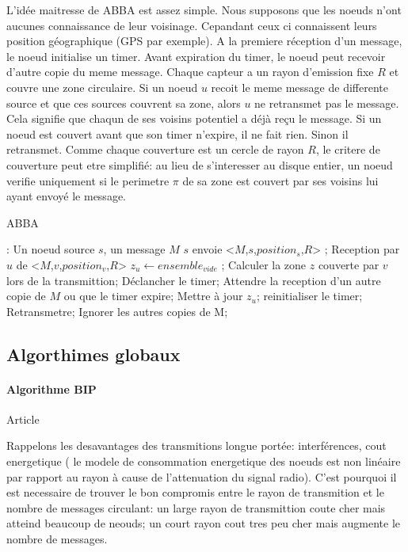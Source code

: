 L'idée maitresse de ABBA est assez simple. Nous supposons que les noeuds n'ont aucunes connaissance de leur voisinage. Cepandant ceux ci connaissent leurs position géographique (GPS par exemple).
A la premiere réception d'un message, le noeud initialise un timer. Avant expiration du timer, le noeud peut recevoir d'autre copie du meme message. Chaque capteur a un rayon d'emission fixe $R$
et couvre une zone circulaire. Si un noeud $u$ recoit le meme message de differente source et que ces sources couvrent sa zone, alors $u$ ne retransmet pas le message.
Cela signifie que chaqun de ses voisins potentiel a déjà reçu le message. Si un noeud est couvert avant que son timer n'expire, il ne fait rien. Sinon il retransmet.
Comme chaque couverture est un cercle de rayon $R$, le critere de couverture peut etre simplifié: au lieu de s'interesser au disque entier, un noeud verifie uniquement si le perimetre $\pi$ de sa zone est couvert par 
ses voisins lui ayant envoyé le message. 

\begin{algorithm}[h]
\caption{ABBA}
\label{ABBA}
\begin{algorithmic}
\REQUIRE:
Un noeud source $s$, un message $M$
\STATE $s$ envoie  <$M$,$s$,$position_s$,$R$> ;
\STATE Reception  par  $u$ de  <$M$,$v$,$position_v$,$R$>
\STATE $z_u\leftarrow ensemble_{vide}$ ;
\STATE Calculer la zone $z$ couverte par $v$ lors de la transmittion;
\STATE Déclancher le timer;
\REPEAT
    \STATE Attendre la reception d'un autre copie de $M$ ou que le timer expire;
	\STATE Mettre à jour $z_u$;
	\STATE reinitialiser le timer;
    \ENDIF
{}
    \STATE Retransmetre;
\ENDIF
     \STATE Ignorer les autres copies de M;

\end{algorithmic}
\end{algorithm}




\subsection{Algorthimes globaux}
\paragraph{Algorithme BIP}
Article \cite{Wieselthier2000}

  Rappelons les desavantages des transmitions longue portée: interférences, cout energetique ( le modele de consommation energetique des noeuds est non linéaire par rapport au rayon à cause de l'attenuation du signal radio).
C'est pourquoi il est necessaire de trouver le bon compromis entre le rayon de transmition et le nombre de messages circulant: un large rayon de transmittion coute cher mais atteind beaucoup de neouds; un court rayon cout tres peu cher mais 
augmente le nombre de messages. 

